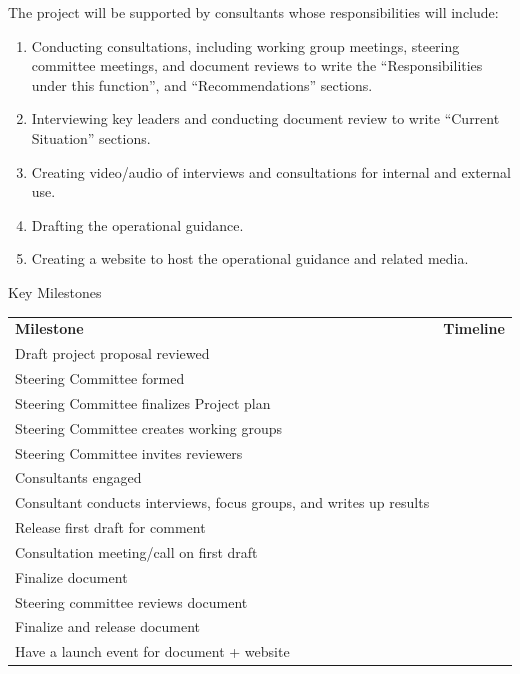 \documentclass[
  letterpaper,
  DIV=11,
  numbers=noendperiod,
  oneside]{scrreprt}
\begin{document}
The project will be supported by consultants whose responsibilities will
include:

\begin{enumerate}
\def\labelenumi{\arabic{enumi}.}
\item
  Conducting consultations, including working group meetings, steering
  committee meetings, and document reviews to write the
  ``Responsibilities under this function'', and ``Recommendations''
  sections.~
\item
  Interviewing key leaders and conducting document review to write
  ``Current Situation'' sections.
\item
  Creating video/audio of interviews and consultations for internal and
  external use.
\item
  Drafting the operational guidance.
\item
  Creating a website to host the operational guidance and related media.
\end{enumerate}

\hfill\break
\hfill\break
\hfill\break

Key Milestones

\hfill\break

\begin{longtable}[]{@{}
  >{\raggedright\arraybackslash}p{}
  >{\raggedright\arraybackslash}p{}@{}}
\toprule\noalign{}
\endhead
\bottomrule\noalign{}
\endlastfoot
\textbf{Milestone} & \textbf{Timeline} \\
Draft project proposal reviewed & \\
Steering Committee formed & \\
Steering Committee finalizes Project plan & \\
Steering Committee creates working groups~ & \\
Steering Committee invites reviewers & \\
Consultants engaged & \\
Consultant conducts interviews, focus groups, and writes up results & \\
Release first draft for comment~ & \\
Consultation meeting/call on first draft & \\
Finalize document & \\
Steering committee reviews document & \\
Finalize and release document & \\
Have a launch event for document + website & \\
\end{longtable}
\end{document}
